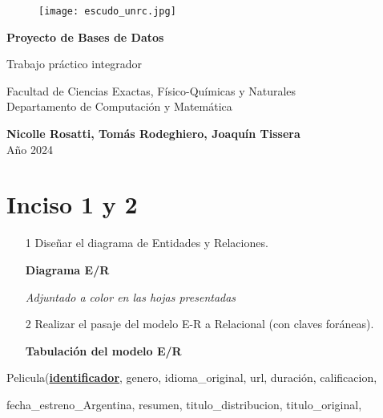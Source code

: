 \documentclass[15pt]{article}
\begin{document}
\begin{titlepage}
    \centering
    \begin{figure}
        \centering
        \texttt{[image: escudo\_unrc.jpg]}
    \end{figure}
    \vfill
    
    \huge
    \textbf{Proyecto de Bases de Datos}
    \vspace{0.5cm}
    
    \LARGE
    Trabajo práctico integrador
    \vspace{1cm}

    \Large
    Facultad de Ciencias Exactas, Físico-Químicas y Naturales\\
    Departamento de Computación y Matemática\\
    \vspace{0.5cm}
    
    \vfill
    \Large
    \textbf{Nicolle Rosatti, Tomás Rodeghiero, Joaquín Tissera}\\
    \vspace{0.25cm}
    Año 2024
    \vspace{1.5cm}
\end{titlepage}

\newpage

\section{Inciso 1 y 2}
    \begin{itemize}
        \item[1] Diseñar el diagrama de Entidades y Relaciones.
            \begin{center}
              \textbf{Diagrama E/R}
              
              \textit{Adjuntado a color en las hojas presentadas}
              \newline
            \end{center}
        \item[2] Realizar el pasaje del modelo E-R a Relacional (con claves foráneas).
            \begin{center}
                \textbf{Tabulación del modelo E/R}
            \end{center}
    \end{itemize}
\newline
Pelicula(\underline{\textbf{identificador}}, genero, idioma\_original, url, duración, calificacion, 

fecha\_estreno\_Argentina, resumen, titulo\_distribucion, titulo\_original, 
\end{document}
